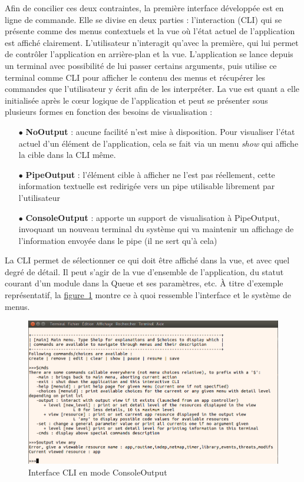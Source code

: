 \documentclass[]{article}
\newcommand{\wordlink}[2]{\hyperref[#1]{#2~\ref{#1}}}
\begin{document}
\par Afin de concilier ces deux contraintes, la première interface développée est en ligne de commande. Elle se divise en deux parties : l'interaction (CLI) qui se présente comme des menus contextuels et la vue où l'état actuel de l'application est affiché clairement. L'utilisateur n'interagit qu'avec la première, qui lui permet de contrôler l'application en arrière-plan et la vue. L'application se lance depuis un terminal avec possibilité de lui passer certains arguments, puis utilise ce terminal comme CLI pour afficher le contenu des menus et récupérer les commandes que l'utilisateur y écrit afin de les interpréter. La vue est quant a elle initialisée après le cœur logique de l'application et peut se présenter sous plusieurs formes  en fonction des besoins de visualisation :
\vspace{0.2cm}
\begin{itemize}
\item[$\bullet$] \textbf{NoOutput} : aucune facilité n'est mise à disposition. Pour visualiser l'état actuel d'un élément de l'application, cela se fait via un menu \textit{show} qui affiche la cible dans la CLI même.
\vspace{0.2cm}
\item[$\bullet$] \textbf{PipeOutput} : l'élément cible à afficher ne l'est pas réellement, cette information textuelle est redirigée vers un pipe utilisable librement par l'utilisateur
\vspace{0.2cm}
\item[$\bullet$] \textbf{ConsoleOutput} : apporte un support de visualisation à PipeOutput, invoquant un nouveau terminal du système qui va maintenir un affichage de l'information envoyée dans le pipe (il ne sert qu'à cela)
\end{itemize}
\vspace{0.2cm}

\par La CLI permet de sélectionner ce qui doit être affiché dans la vue, et avec quel degré de détail. Il peut s'agir de la vue d'ensemble de l'application, du statut courant d'un module dans la Queue et ses paramètres, etc. À titre d'exemple représentatif, la \wordlink{cli}{figure} montre ce à quoi ressemble l'interface et le système de menus.

\begin{figure}[!ht]
\centering
     \includegraphics[width=0.7\linewidth]{clicmds}
     \caption{Interface CLI en mode ConsoleOutput}
     \label{cli}
\end{figure}
\end{document}
